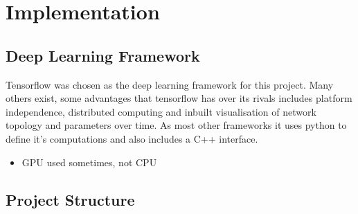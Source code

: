 \chapter{Implementation}
\section{Deep Learning Framework}
Tensorflow \cite{tensorflow} was chosen as the deep learning framework for this
project. Many others exist, some advantages that tensorflow has over its rivals
includes platform independence, distributed computing and inbuilt visualisation
of network topology and parameters over time. As most other frameworks it uses python
to define it's computations and also includes a C++ interface.
\begin{itemize}
  \item GPU used sometimes, not CPU
\end{itemize}
\section{Project Structure}
